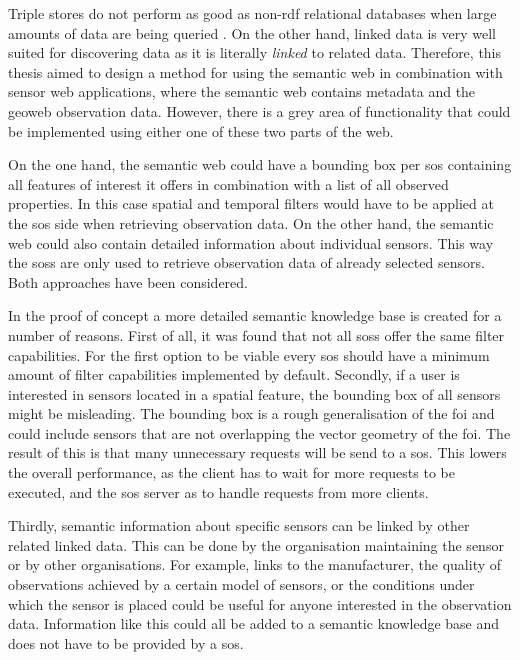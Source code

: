 \begin{enumerate}
Triple stores do not perform as good as non-\ac{rdf} relational databases when large amounts of data are being queried \citep{LD:Bizer2}. On the other hand, linked data is very well suited for discovering data as it is literally \textit{linked} to related data. Therefore, this thesis aimed to design a method for using the semantic web in combination with sensor web applications, where the semantic web contains metadata and the geoweb observation data. However, there is a grey area of functionality that could be implemented using either one of these two parts of the web. 

On the one hand, the semantic web could have a bounding box per \ac{sos} containing all features of interest it offers in combination with a list of all observed properties. In this case spatial and temporal filters would have to be applied at the \ac{sos} side when retrieving observation data. On the other hand, the semantic web could also contain detailed information about individual sensors. This way the \aclp{sos} are only used to retrieve observation data of already selected sensors. Both approaches have been considered.

In the proof of concept a more detailed semantic knowledge base is created for a number of reasons. First of all, it was found that not all \aclp{sos} offer the same filter capabilities. For the first option to be viable every \ac{sos} should have a minimum amount of filter capabilities implemented by default. 
Secondly, if a user is interested in sensors located in a spatial feature, the bounding box of all sensors might be misleading. The bounding box is a rough generalisation of the \ac{foi} and could include sensors that are not overlapping the vector geometry of the \ac{foi}. The result of this is that many unnecessary requests will be send to a \ac{sos}. This lowers the overall performance, as the client has to wait for more requests to be executed, and the \ac{sos} server as to handle requests from more clients. 

Thirdly, semantic information about specific sensors can be linked by other related linked data. This can be done by the organisation maintaining the sensor or by other organisations. For example, links to the manufacturer, the quality of observations achieved by a certain model of sensors, or the conditions under which the sensor is placed could be useful for anyone interested in the observation data. Information like this could all be added to a semantic knowledge base and does not have to be provided by a \ac{sos}.


\end{enumerate}
